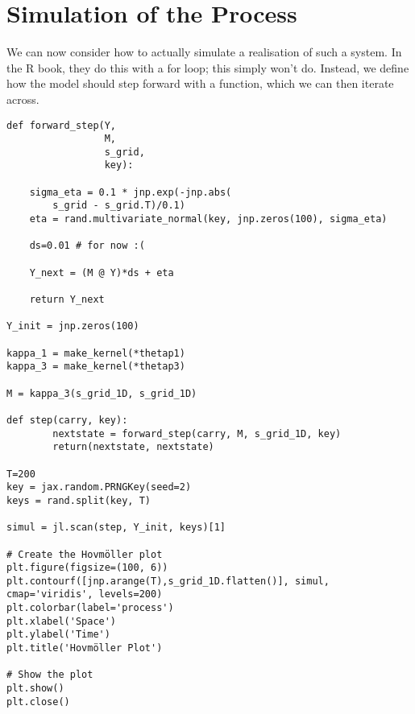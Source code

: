 \documentclass[letterpaper]{article}
\begin{document}
\section{Simulation of the Process}
\label{sec:org9e21e8c}

We can now consider how to actually simulate a realisation of such a system. In the R book, they do this with a for loop; this simply won't do. Instead, we define how the model should step forward with a function, which we can then iterate across.

\begin{verbatim}
def forward_step(Y,
                 M,
                 s_grid,
                 key):

    sigma_eta = 0.1 * jnp.exp(-jnp.abs(
        s_grid - s_grid.T)/0.1)
    eta = rand.multivariate_normal(key, jnp.zeros(100), sigma_eta)

    ds=0.01 # for now :(
    
    Y_next = (M @ Y)*ds + eta

    return Y_next

Y_init = jnp.zeros(100)

kappa_1 = make_kernel(*thetap1)
kappa_3 = make_kernel(*thetap3)

M = kappa_3(s_grid_1D, s_grid_1D)

def step(carry, key):
        nextstate = forward_step(carry, M, s_grid_1D, key)
        return(nextstate, nextstate)

T=200
key = jax.random.PRNGKey(seed=2)
keys = rand.split(key, T)
    
simul = jl.scan(step, Y_init, keys)[1]

# Create the Hovmöller plot
plt.figure(figsize=(100, 6))
plt.contourf([jnp.arange(T),s_grid_1D.flatten()], simul, cmap='viridis', levels=200)
plt.colorbar(label='process')
plt.xlabel('Space')
plt.ylabel('Time')
plt.title('Hovmöller Plot')

# Show the plot
plt.show()
plt.close()
\end{verbatim}
\end{document}
